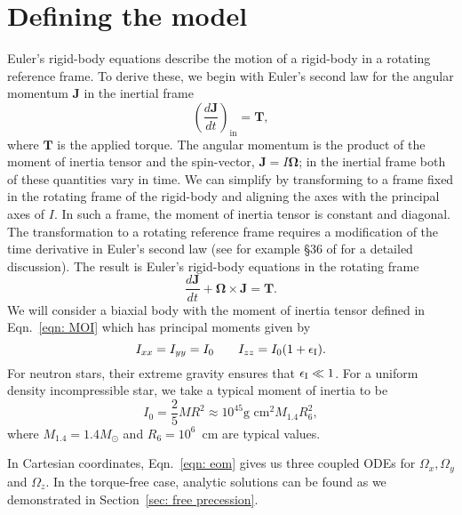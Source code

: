 \documentclass[../full_thesis/full_thesis.tex]{subfiles}
\begin{document}
\section{Defining the model}
\label{sec: defining the model}

Euler's rigid-body equations describe the motion of a rigid-body in a rotating
reference frame. To derive these, we begin with Euler's second law for the
angular momentum $\mathbf{J}$ in the inertial frame
\begin{equation}
    \left(\frac{d\mathbf{J}}{dt}\right)_{\textrm{in}}=\mathbf{T},
\end{equation}
where $\mathbf{T}$ is the applied torque. The angular momentum is the product
of the moment of inertia tensor and the spin-vector, $\mathbf{J}=I
\mathbf{\Omega}$; in the inertial frame both of these quantities vary in time.
We can simplify by transforming to a frame fixed in the rotating frame of the
rigid-body and aligning the axes with the principal axes of $I$. In such a
frame, the moment of inertia tensor is constant and diagonal. The
transformation to a rotating reference frame requires a modification of the
time derivative in Euler's second law (see for example \S36 of \citet{Landau1969} for a
detailed discussion). The result is Euler's rigid-body equations in the
rotating frame
\begin{equation}
    \frac{d\mathbf{J}}{dt} + \mathbf{\Omega} \times \mathbf{J} = \mathbf{T}.
    \label{eqn: eom}
\end{equation}
We will consider a biaxial body with the moment  of inertia tensor
defined in Eqn.~\eqref{eqn: MOI} which has principal moments given by
\begin{equation}
I_{xx} = I_{yy} = I_{0} \;\;\;\;\;\;\; I_{zz} = I_{0}(1+\epsilon_{\mathrm{I}}).
\end{equation}
For neutron stars, their extreme gravity ensures that $\epsilon_{\mathrm{I}} \ll 1$. For
a uniform density incompressible star, we take a typical moment of inertia to be
\begin{equation}
I_{0} = \frac{2}{5}MR^{2} \approx 10^{45}\textrm{g cm}^{2} M_{1.4}R_6^{2},
\end{equation}
where $M_{1.4} = 1.4 M_{\odot}$ and $R_6=10^{6}$~cm are typical values.

In Cartesian coordinates, Eqn.~\eqref{eqn: eom} gives us three coupled ODEs
for $\Omega_{x}, \Omega_{y}$ and $\Omega_{z}$. In the torque-free case, analytic
solutions can be found as we demonstrated in Section~\ref{sec: free precession}.
\end{document}
